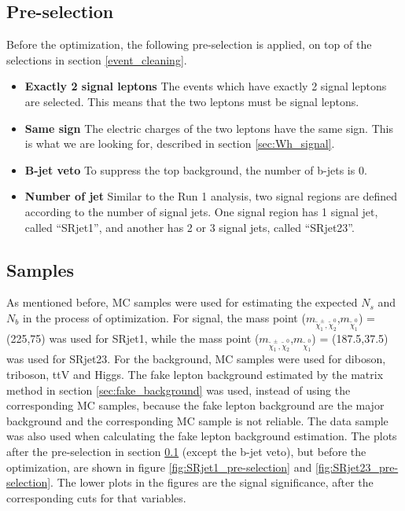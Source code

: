 \subsection{Pre-selection}
\label{sec:SR_pre-selection}
Before the optimization, the following pre-selection is applied, on top of the selections in section \ref{event_cleaning}.
\begin{itemize}
\item \textbf{Exactly 2 signal leptons} The events which have exactly 2 signal leptons are selected. This means that the two leptons must be signal leptons.
\item \textbf{Same sign} The electric charges of the two leptons have the same sign. This is what we are looking for, described in section \ref{sec:Wh_signal}.
\item \textbf{B-jet veto} To suppress the top background, the number of b-jets is 0.
\item \textbf{Number of jet} Similar to the Run 1 analysis, two signal regions are defined according to the number of signal jets. One signal region has 1 signal jet, called ``SRjet1'', and another has 2 or 3 signal jets, called ``SRjet23''.
\end{itemize}

\subsection{Samples}
As mentioned before, MC samples were used for estimating the expected $N_s$ and $N_b$ in the process of optimization.
For signal, the mass point ($m_{\tilde{\chi}_1^\pm , \tilde{\chi}_2^0}$,$m_{\tilde{\chi}_1^0}$) = (225,75) was used for SRjet1, while the mass point ($m_{\tilde{\chi}_1^\pm , \tilde{\chi}_2^0}$,$m_{\tilde{\chi}_1^0}$) = (187.5,37.5) was used for SRjet23.
For the background, MC samples were used for diboson, triboson, ttV and Higgs.
The fake lepton background estimated by the matrix method in section \ref{sec:fake_background} was used, instead of using the corresponding MC samples, because the fake lepton background are the major background and the corresponding MC sample is not reliable.
The data sample was also used when calculating the fake lepton background estimation.
The plots after the pre-selection in section \ref{sec:SR_pre-selection} (except the b-jet veto), but before the optimization, are shown in figure \ref{fig:SRjet1_pre-selection} and \ref{fig:SRjet23_pre-selection}. The lower plots in the figures are the signal significance, after the corresponding cuts for that variables.

